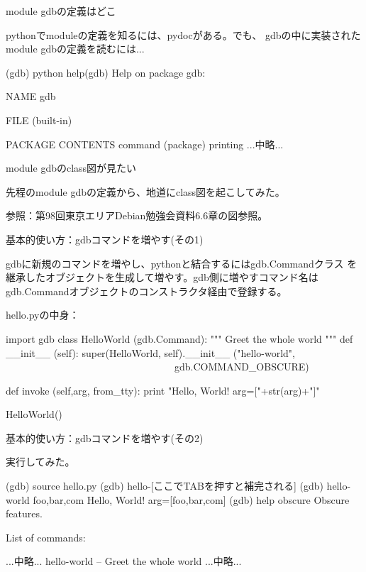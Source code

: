 \begin{frame}[containsverbatim]{module gdbの定義はどこ}

pythonでmoduleの定義を知るには、pydocがある。でも、
gdbの中に実装されたmodule gdbの定義を読むには...


\begin{commandline}
(gdb) python help(gdb)
Help on package gdb:

NAME
    gdb

FILE
    (built-in)

PACKAGE CONTENTS
    command (package)
    printing
...中略...
\end{commandline}

\end{frame}

\begin{frame}{module gdbのclass図が見たい}
\Large

先程のmodule gdbの定義から、地道にclass図を起こしてみた。

参照：第98回東京エリアDebian勉強会資料6.6章の図参照。

\end{frame}

\begin{frame}[containsverbatim]{基本的使い方：gdbコマンドを増やす(その1)}

gdbに新規のコマンドを増やし、pythonと結合するにはgdb.Commandクラス
を継承したオブジェクトを生成して増やす。gdb側に増やすコマンド名は
gdb.Commandオブジェクトのコンストラクタ経由で登録する。

hello.pyの中身：
\begin{commandline}
import gdb                      
class HelloWorld (gdb.Command): 
  """ Greet the whole world """ 
  def __init__ (self):
     super(HelloWorld, self).__init__ ("hello-world",
　　　　　　　　　　　　　　　　　gdb.COMMAND_OBSCURE)

  def invoke (self,arg, from_tty): 
     print "Hello, World! arg=["+str(arg)+"]"

HelloWorld()　
\end{commandline}

\end{frame}

\begin{frame}[containsverbatim]{基本的使い方：gdbコマンドを増やす(その2)}

実行してみた。

\begin{commandline}
(gdb) source hello.py
(gdb) hello-[ここでTABを押すと補完される]
(gdb) hello-world foo,bar,com
Hello, World! arg=[foo,bar,com]
(gdb) help obscure
Obscure features.

List of commands:

...中略...
hello-world --  Greet the whole world 
...中略...
\end{commandline}

\end{frame}


